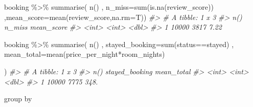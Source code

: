 \documentclass[
]{article}
\newenvironment{Shaded}{\begin{snugshade}}{\end{snugshade}}
\newcommand{\AttributeTok}[1]{\textcolor[rgb]{0.77,0.63,0.00}{#1}}
\newcommand{\CommentTok}[1]{\textcolor[rgb]{0.56,0.35,0.01}{\textit{#1}}}
\newcommand{\FunctionTok}[1]{\textcolor[rgb]{0.00,0.00,0.00}{#1}}
\newcommand{\NormalTok}[1]{#1}
\newcommand{\SpecialCharTok}[1]{\textcolor[rgb]{0.00,0.00,0.00}{#1}}
\newcommand{\StringTok}[1]{\textcolor[rgb]{0.31,0.60,0.02}{#1}}
\begin{document}
\begin{Shaded}
\begin{Highlighting}[]
\NormalTok{booking }\SpecialCharTok{\%\textgreater{}\%} 
  \FunctionTok{summarise}\NormalTok{(}
    \FunctionTok{n}\NormalTok{()}
\NormalTok{    , }\AttributeTok{n\_miss=}\FunctionTok{sum}\NormalTok{(}\FunctionTok{is.na}\NormalTok{(review\_score))}
\NormalTok{    ,}\AttributeTok{mean\_score=}\FunctionTok{mean}\NormalTok{(review\_score,}\AttributeTok{na.rm=}\NormalTok{T))}
\CommentTok{\#\textgreater{} \# A tibble: 1 x 3}
\CommentTok{\#\textgreater{}   \textasciigrave{}n()\textasciigrave{} n\_miss mean\_score}
\CommentTok{\#\textgreater{}   \textless{}int\textgreater{}  \textless{}int\textgreater{}      \textless{}dbl\textgreater{}}
\CommentTok{\#\textgreater{} 1 10000   3817       7.22}

\NormalTok{booking }\SpecialCharTok{\%\textgreater{}\%} 
  \FunctionTok{summarise}\NormalTok{(}
    \FunctionTok{n}\NormalTok{()}
\NormalTok{    , }\AttributeTok{stayed\_booking=}\FunctionTok{sum}\NormalTok{(status}\SpecialCharTok{==}\StringTok{\textquotesingle{}stayed\textquotesingle{}}\NormalTok{)}
\NormalTok{    , }\AttributeTok{mean\_total=}\FunctionTok{mean}\NormalTok{(price\_per\_night}\SpecialCharTok{*}\NormalTok{room\_nights)                   }
    
\NormalTok{  )}
\CommentTok{\#\textgreater{} \# A tibble: 1 x 3}
\CommentTok{\#\textgreater{}   \textasciigrave{}n()\textasciigrave{} stayed\_booking mean\_total}
\CommentTok{\#\textgreater{}   \textless{}int\textgreater{}          \textless{}int\textgreater{}      \textless{}dbl\textgreater{}}
\CommentTok{\#\textgreater{} 1 10000           7775       348.}
\end{Highlighting}
\end{Shaded}

group by
\end{document}
